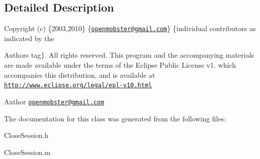 \subsection{\-Detailed \-Description}
\-Copyright (c) \{2003,2010\} \{\href{mailto:openmobster@gmail.com}{\tt openmobster@gmail.\-com}\} \{individual contributors as indicated by the \begin{DoxyAuthor}{\-Authors}
tag\}. \-All rights reserved. \-This program and the accompanying materials are made available under the terms of the \-Eclipse \-Public \-License v1. which accompanies this distribution, and is available at \href{http://www.eclipse.org/legal/epl-v10.html}{\tt http\-://www.\-eclipse.\-org/legal/epl-\/v10.\-html}
\end{DoxyAuthor}
\begin{DoxyAuthor}{\-Author}
\href{mailto:openmobster@gmail.com}{\tt openmobster@gmail.\-com} 
\end{DoxyAuthor}


\-The documentation for this class was generated from the following files\-:\begin{DoxyCompactItemize}
\item 
\-Close\-Session.\-h\item 
\-Close\-Session.\-m\end{DoxyCompactItemize}

